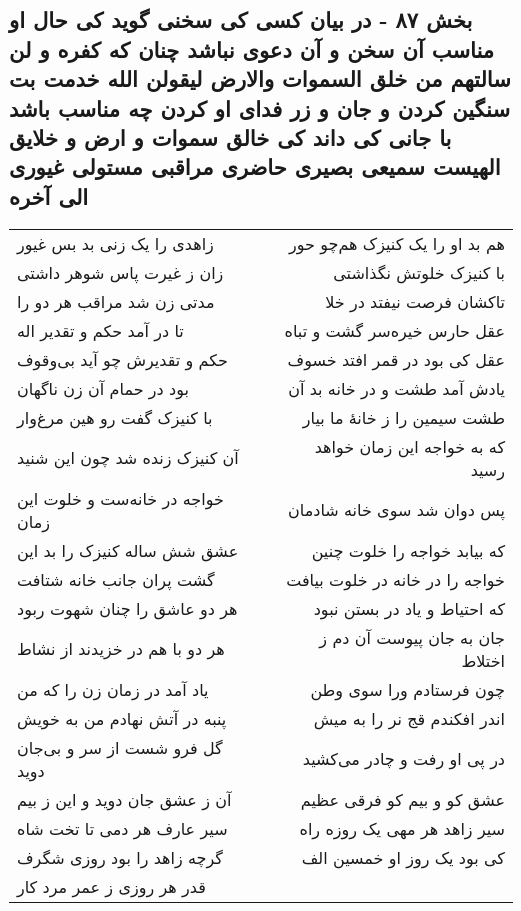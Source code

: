 \begin{center}
\section*{بخش ۸۷ - در بیان کسی کی سخنی گوید کی حال او مناسب آن سخن و آن دعوی نباشد چنان که کفره و لن سالتهم من خلق السموات والارض لیقولن الله خدمت بت سنگین کردن و جان و زر فدای او کردن چه مناسب باشد با جانی کی داند کی خالق سموات و ارض و خلایق الهیست سمیعی بصیری حاضری مراقبی مستولی غیوری الی آخره}
\label{sec:sh087}
\begin{longtable}{l p{0.5cm} r}
زاهدی را یک زنی بد بس غیور
&&
هم بد او را یک کنیزک هم‌چو حور
\\
زان ز غیرت پاس شوهر داشتی
&&
با کنیزک خلوتش نگذاشتی
\\
مدتی زن شد مراقب هر دو را
&&
تاکشان فرصت نیفتد در خلا
\\
تا در آمد حکم و تقدیر اله
&&
عقل حارس خیره‌سر گشت و تباه
\\
حکم و تقدیرش چو آید بی‌وقوف
&&
عقل کی بود در قمر افتد خسوف
\\
بود در حمام آن زن ناگهان
&&
یادش آمد طشت و در خانه بد آن
\\
با کنیزک گفت رو هین مرغ‌وار
&&
طشت سیمین را ز خانهٔ ما بیار
\\
آن کنیزک زنده شد چون این شنید
&&
که به خواجه این زمان خواهد رسید
\\
خواجه در خانه‌ست و خلوت این زمان
&&
پس دوان شد سوی خانه شادمان
\\
عشق شش ساله کنیزک را بد این
&&
که بیابد خواجه را خلوت چنین
\\
گشت پران جانب خانه شتافت
&&
خواجه را در خانه در خلوت بیافت
\\
هر دو عاشق را چنان شهوت ربود
&&
که احتیاط و یاد در بستن نبود
\\
هر دو با هم در خزیدند از نشاط
&&
جان به جان پیوست آن دم ز اختلاط
\\
یاد آمد در زمان زن را که من
&&
چون فرستادم ورا سوی وطن
\\
پنبه در آتش نهادم من به خویش
&&
اندر افکندم قج نر را به میش
\\
گل فرو شست از سر و بی‌جان دوید
&&
در پی او رفت و چادر می‌کشید
\\
آن ز عشق جان دوید و این ز بیم
&&
عشق کو و بیم کو فرقی عظیم
\\
سیر عارف هر دمی تا تخت شاه
&&
سیر زاهد هر مهی یک روزه راه
\\
گرچه زاهد را بود روزی شگرف
&&
کی بود یک روز او خمسین الف
\\
قدر هر روزی ز عمر مرد کار

\end{longtable}
\end{center}
